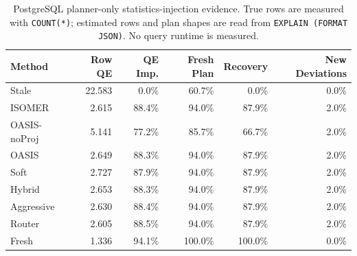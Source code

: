 \begin{table}[t]
  \centering
  \small
  \caption{PostgreSQL planner-only statistics-injection evidence. True rows are measured with \texttt{COUNT(*)}; estimated rows and plan shapes are read from \texttt{EXPLAIN (FORMAT JSON)}. No query runtime is measured.}
  \label{tab:postgres_planner_stats_injection}
  \setlength{\tabcolsep}{4pt}
  \begin{tabular}{lrrrrr}
    \toprule
    Method & Row QE & QE Imp. & Fresh Plan & Recovery & New Deviations \\
    \midrule
    Stale & 22.583 & 0.0\% & 60.7\% & 0.0\% & 0.0\% \\
    ISOMER & 2.615 & 88.4\% & 94.0\% & 87.9\% & 2.0\% \\
    OASIS-noProj & 5.141 & 77.2\% & 85.7\% & 66.7\% & 2.0\% \\
    OASIS & 2.649 & 88.3\% & 94.0\% & 87.9\% & 2.0\% \\
    Soft & 2.727 & 87.9\% & 94.0\% & 87.9\% & 2.0\% \\
    Hybrid & 2.653 & 88.3\% & 94.0\% & 87.9\% & 2.0\% \\
    Aggressive & 2.630 & 88.4\% & 94.0\% & 87.9\% & 2.0\% \\
    Router & 2.605 & 88.5\% & 94.0\% & 87.9\% & 2.0\% \\
    Fresh & 1.336 & 94.1\% & 100.0\% & 100.0\% & 0.0\% \\
    \bottomrule
  \end{tabular}
\end{table}
